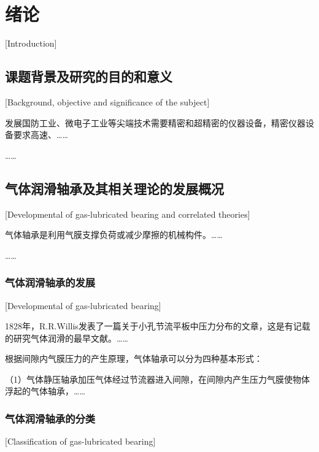 
\chapter{绪论}[Introduction]

\section{课题背景及研究的目的和意义}[Background, objective and significance of the subject]

发展国防工业、微电子工业等尖端技术需要精密和超精密的仪器设备，精密仪器设备要求高速、……

……

\section{气体润滑轴承及其相关理论的发展概况}[Developmental of gas-lubricated bearing and correlated theories]

气体轴承是利用气膜支撑负荷或减少摩擦的机械构件。……

……

\subsection{气体润滑轴承的发展}[Developmental of gas-lubricated bearing]

1828年，R.R.Willis\cite{zhao1998}发表了一篇关于小孔节流平板中压力分布的文章，这是有记载的研究气体润滑的最早文献。……

根据间隙内气膜压力的产生原理，气体轴承可以分为四种基本形式：

（1）气体静压轴承\quad 加压气体经过节流器进入间隙，在间隙内产生压力气膜使物体浮起的气体轴承，……

\subsection{气体润滑轴承的分类}[Classification of gas-lubricated bearing]

